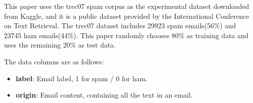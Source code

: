 This paper uses the trec07 spam corpus\cite{trecspam2007} as the experimental dataset downloaded from Kaggle, and it is a public dataset provided by the International Conference on Text Retrieval. The trec07 dataset includes 29923 spam emails(56\%) and 23745 ham emails(44\%). This paper randomly chooses 80\% as training data and uses the remaining 20\% as test data.

The data columns are as follows:
\begin{itemize}
    \item \textbf{label}: Email label, 1 for spam / 0 for ham.
    \item \textbf{origin}: Email content, containing all the text in an email.
\end{itemize}